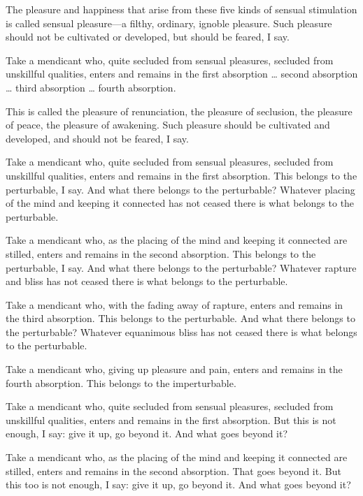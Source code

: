 \documentclass[12pt,openany]{book}%
\begin{document}
The pleasure and happiness that arise from these five kinds of sensual stimulation is called sensual pleasure—a filthy, ordinary, ignoble pleasure. Such pleasure should not be cultivated or developed, but should be feared, I say. 

Take a mendicant who, quite secluded from sensual pleasures, secluded from unskillful qualities, enters and remains in the first absorption … second absorption … third absorption … fourth absorption. 

This is called the pleasure of renunciation, the pleasure of seclusion, the pleasure of peace, the pleasure of awakening. Such pleasure should be cultivated and developed, and should not be feared, I say. 

Take a mendicant who, quite secluded from sensual pleasures, secluded from unskillful qualities, enters and remains in the first absorption. This belongs to the perturbable, I say. And what there belongs to the perturbable? Whatever placing of the mind and keeping it connected has not ceased there is what belongs to the perturbable. 

Take a mendicant who, as the placing of the mind and keeping it connected are stilled, enters and remains in the second absorption. This belongs to the perturbable, I say. And what there belongs to the perturbable? Whatever rapture and bliss has not ceased there is what belongs to the perturbable. 

Take a mendicant who, with the fading away of rapture, enters and remains in the third absorption. This belongs to the perturbable. And what there belongs to the perturbable? Whatever equanimous bliss has not ceased there is what belongs to the perturbable. 

Take a mendicant who, giving up pleasure and pain, enters and remains in the fourth absorption. This belongs to the imperturbable. 

Take a mendicant who, quite secluded from sensual pleasures, secluded from unskillful qualities, enters and remains in the first absorption. But this is not enough, I say: give it up, go beyond it. And what goes beyond it? 

Take a mendicant who, as the placing of the mind and keeping it connected are stilled, enters and remains in the second absorption. That goes beyond it. But this too is not enough, I say: give it up, go beyond it. And what goes beyond it? 
\end{document}
